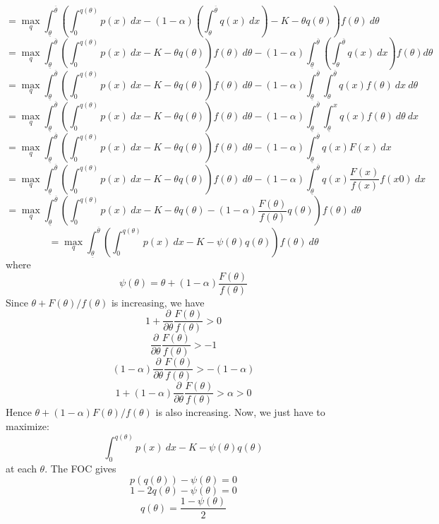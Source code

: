 \documentclass[10pt,letter]{article}
\begin{document}
\begin{enumerate}[label=(\alph*)]
\[ = \max_q \int_{\underline{\theta}}^{\overline{\theta}} \left(\int_0^{q(\theta)}p(x) \ dx -(1- \alpha) \left(\int_{\theta}^{\overline{\theta}} q(x) \ dx \right) - K - \theta q(\theta)\right)f(\theta) \ d\theta \]
\[ = \max_q \int_{\underline{\theta}}^{\overline{\theta}} \left(\int_0^{q(\theta)}p(x) \ dx - K - \theta q(\theta)\right)f(\theta) \ d\theta -(1- \alpha) \int_{\underline{\theta}}^{\overline{\theta}}\left(\int_{\theta}^{\overline{\theta}} q(x) \ dx \right) f(\theta) d \theta \]
\[ = \max_q \int_{\underline{\theta}}^{\overline{\theta}} \left(\int_0^{q(\theta)}p(x) \ dx - K - \theta q(\theta)\right)f(\theta) \ d\theta -(1- \alpha) \int_{\underline{\theta}}^{\overline{\theta}}\int_{\theta}^{\overline{\theta}} q(x) f(\theta) \ dx  \ d \theta \]
\[ = \max_q \int_{\underline{\theta}}^{\overline{\theta}} \left(\int_0^{q(\theta)}p(x) \ dx - K - \theta q(\theta)\right)f(\theta) \ d\theta - (1- \alpha) \int_{\underline{\theta}}^{\overline{\theta}} \int_{\underline{\theta}}^{x} q(x) f(\theta) \ d \theta \ dx    \]
\[ = \max_q \int_{\underline{\theta}}^{\overline{\theta}} \left(\int_0^{q(\theta)}p(x) \ dx - K - \theta q(\theta)\right)f(\theta) \ d\theta - (1- \alpha) \int_{\underline{\theta}}^{\overline{\theta}} q(x) F(x) \ dx    \]
\[ = \max_q \int_{\underline{\theta}}^{\overline{\theta}} \left(\int_0^{q(\theta)}p(x) \ dx - K - \theta q(\theta)\right)f(\theta) \ d\theta - (1- \alpha) \int_{\underline{\theta}}^{\overline{\theta}} q(x) \frac{F(x)}{f(x)} f(x0) \ dx    \]
\[ = \max_q \int_{\underline{\theta}}^{\overline{\theta}} \left(\int_0^{q(\theta)}p(x) \ dx - K - \theta q(\theta) - (1-\alpha)\frac{F(\theta)}{f(\theta)}q(\theta) \right)f(\theta) \ d\theta    \]
\[ = \max_q \int_{\underline{\theta}}^{\overline{\theta}} \left(\int_0^{q(\theta)}p(x) \ dx - K - \psi(\theta) q(\theta)  \right)f(\theta) \ d\theta    \]
where
\[ \psi(\theta) = \theta + (1-\alpha) \frac{F(\theta)}{f(\theta)} \]
Since $\theta + F(\theta)/f(\theta)$ is increasing, we have
\[ 1 + \frac{\partial}{\partial \theta} \frac{F(\theta)}{f(\theta)} > 0 \]
\[ \frac{\partial}{\partial \theta} \frac{F(\theta)}{f(\theta)} > -1 \]
\[ (1-\alpha)\frac{\partial}{\partial \theta} \frac{F(\theta)}{f(\theta)} > -(1-\alpha) \]
\[ 1 + (1-\alpha)\frac{\partial}{\partial \theta} \frac{F(\theta)}{f(\theta)} > \alpha > 0 \]
Hence $\theta + (1-\alpha)F(\theta)/f(\theta)$ is also increasing. Now, we just have to maximize:
\[\int_0^{q(\theta)}p(x) \ dx - K - \psi(\theta) q(\theta)  \]
at each $\theta$. The FOC gives
\[ p(q(\theta)) - \psi(\theta) = 0 \]
\[ 1 - 2q(\theta) - \psi(\theta) = 0 \]
\[ q(\theta) = \frac{1-\psi(\theta)}{2}\]

\end{enumerate}
\end{document}
